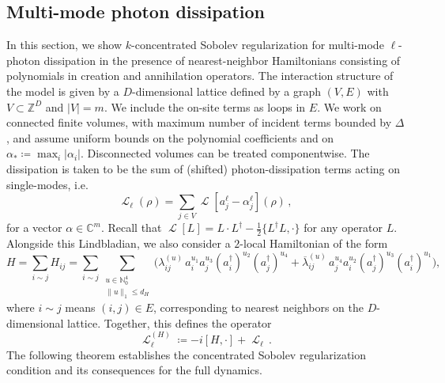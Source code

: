 \documentclass[11pt]{article}
\theoremstyle{myplain}
\theoremstyle{mydefinition}
\theoremstyle{remark}
\DeclareMathOperator{\cL}{\mathcal{L}}
\DeclareMathOperator{\1}{\mathds{1}}
\begin{document}
    \subsection{Multi-mode photon dissipation}\label{subsec:multi-mode-photon-dissipation}
        In this section, we show $k$-concentrated Sobolev regularization for multi-mode $\ell$-photon dissipation in the presence of nearest-neighbor Hamiltonians consisting of polynomials in creation and annihilation operators. The interaction structure of the model is given by a $D$-dimensional lattice defined by a graph $(V,E)$ with $V \subset \mathbb{Z}^D$ and $|V| = m$. We include the on-site terms as loops in $E$. We work on connected finite volumes, with maximum number of incident terms bounded by $\Delta$, and assume uniform bounds on the polynomial coefficients and on $\alpha_*\coloneqq\max_i|\alpha_i|$. Disconnected volumes can be treated componentwise. The dissipation is taken to be the sum of (shifted) photon-dissipation terms acting on single-modes, i.e.
        \begin{equation}\label{eq:multi-mode-ell-dissipation}
            \cL_\ell(\rho) = \sum_{j \in V} \cL[a_j^\ell - \alpha_j^\ell](\rho) \, ,
        \end{equation}
        for a vector $\alpha \in \mathbb{C}^m$. Recall that $\cL[L] = L \cdot L^\dagger - \tfrac{1}{2}\{ L^\dagger L , \cdot \}$ for any operator $L$. Alongside this Lindbladian, we also consider a $2$-local Hamiltonian of the form
        \begin{equation}\label{eq:2-body-Hamiltonian}
            H = \sum_{i \sim j} H_{ij}= \sum_{i \sim j} \sum_{\substack{u \in \mathbb{N}_0^4 \\ \|u\|_1 \le d_H}}\bigl(\lambda_{ij}^{(u)}\, a_i^{u_1} a_j^{u_3} (a_i^\dagger)^{u_2} (a_j^\dagger)^{u_4}+ \overline{\lambda}_{ij}^{(u)}\, a_j^{u_4} a_i^{u_2} (a_j^\dagger)^{u_3} (a_i^\dagger)^{u_1}\bigr),
        \end{equation}
        where $i \sim j$ means $(i,j) \in E$, corresponding to nearest neighbors on the $D$-dimensional lattice. Together, this defines the operator
        \begin{equation}\label{eq:hamiltonian-dissipation}
            \cL_\ell^{(H)}\coloneqq-i[H,\cdot]+\cL_\ell\,.
        \end{equation}
        The following theorem establishes the concentrated Sobolev regularization condition and its consequences for the full dynamics.
\end{document}

